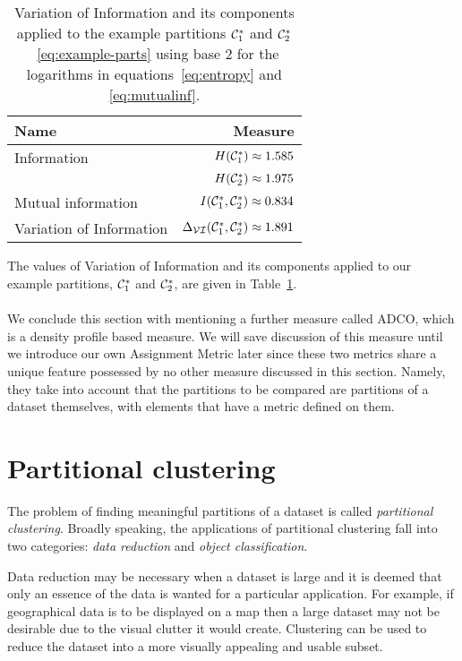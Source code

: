 \begin{table}
  \centering
  \begin{tabular}{lr}
    \toprule
    Name & Measure \\
    \midrule
    Information & $H(\mathcal{C}^*_1) \approx 1.585$ \\
                & $H(\mathcal{C}^*_2) \approx 1.975$ \\
    Mutual information & $I(\mathcal{C}^*_1,\mathcal{C}^*_2) \approx 0.834$ \\
    Variation of Information & $\Delta_{\mathcal{VI}}(\mathcal{C}^*_1,\mathcal{C}^*_2) \approx 1.891$
    \\
    \bottomrule
  \end{tabular}
  \caption{Variation of Information and its components applied to the example
    partitions $\mathcal{C}^*_1$ and $\mathcal{C}^*_2$~\eqref{eq:example-parts} using base
    2 for the logarithms in equations~\eqref{eq:entropy} and
    \eqref{eq:mutualinf}.}
  \label{tab:vi-comparison}
\end{table}

The values of Variation of Information and its components applied to our
example partitions, $\mathcal{C}^*_1$ and $\mathcal{C}^*_2$, are given in
Table~\ref{tab:vi-comparison}.
\\\\
\noindent We conclude this section with mentioning a further measure called
ADCO, which is a density profile based measure.  We will save discussion of
this measure until we introduce our own Assignment Metric later since these
two metrics share a unique feature possessed by no other measure discussed in
this section.  Namely, they take into account that the partitions to be
compared are partitions of a dataset themselves, with elements that have a
metric defined on them.

\section{Partitional clustering}
\label{sec:part-clust-algor}

The problem of finding meaningful partitions of a dataset is called
\textit{partitional clustering}.  Broadly speaking, the applications of
partitional clustering fall into two categories: \textit{data reduction} and
\textit{object classification}.

Data reduction may be necessary when a dataset is large and it is deemed that
only an essence of the data is wanted for a particular application.  For
example, if geographical data is to be displayed on a map then a large dataset
may not be desirable due to the visual clutter it would create.  Clustering
can be used to reduce the dataset into a more visually appealing and usable
subset.

